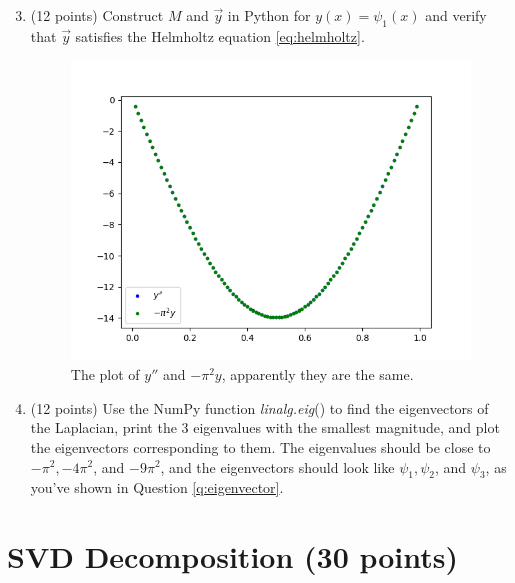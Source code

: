 \documentclass[10pt]{article}
\begin{document}
\begin{enumerate}[label=2.\arabic*]
\setcounter{enumi}{2}

    \item (12 points) 
    Construct $M$ and $\vec{y}$ in Python for $y(x)=\psi_{1}(x)$ and verify that $\vec{y}$ satisfies the Helmholtz equation \ref{eq:helmholtz}.
   	\begin{figure}[H]
    	\centering
    	\includegraphics[scale=0.7]{Eigenvectors/Helmholtz.png}
    	\caption{The plot of $y''$ and $-\pi^2y$, apparently they are the same.}
    \end{figure}
    \item (12 points) 
    Use the NumPy function \textit{linalg.eig}() to find the eigenvectors of the Laplacian, 
    print the 3 eigenvalues with the smallest magnitude, 
    and plot the eigenvectors corresponding to them.
    The eigenvalues should be close to $-\pi^{2},-4 \pi^{2}$, and $-9 \pi^{2}$, 
    and the eigenvectors should look like $\psi_{1}, \psi_{2}$, and $\psi_{3}$, as you've shown in Question \ref{q:eigenvector}.
\end{enumerate}

\section{SVD Decomposition (30 points)}
\end{document}
